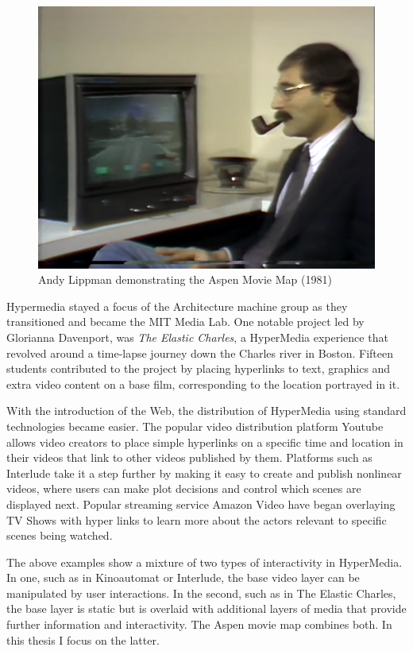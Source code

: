    \begin{figure}[thpb]
      \centering
      \includegraphics[width=\textwidth]{figures/aspenmoviemap.png}
      \caption{Andy Lippman demonstrating the Aspen Movie Map (1981)\cite{lippman1978aspen}}
      \label{fig_pier9}
   \end{figure}

Hypermedia stayed a focus of the Architecture machine group as they transitioned and became the MIT Media Lab. One notable project led by Glorianna Davenport, was \textit{The Elastic Charles}\cite{brondmo1990creating}, a HyperMedia experience that revolved around a time-lapse journey down the Charles river in Boston. Fifteen students contributed to the project by placing hyperlinks to text, graphics and extra video content on a base film, corresponding to the location portrayed in it. 

With the introduction of the Web, the distribution of HyperMedia using standard technologies became easier. The popular video distribution platform Youtube\cite{youtube} allows video creators to place simple hyperlinks on a specific time and location in their videos that link to other videos published by them. Platforms such as Interlude\cite{interlude} take it a step further by making it easy to create and publish nonlinear videos, where users can make plot decisions and control which scenes are displayed next. Popular streaming service Amazon Video \cite{amazonvideo} have began overlaying TV Shows with hyper links to learn more about the actors relevant to specific scenes being watched.

The above examples show a mixture of two types of interactivity in HyperMedia. In one, such as in Kinoautomat or Interlude, the base video layer can be manipulated by user interactions. In the second, such as in The Elastic Charles, the base layer is static but is overlaid with additional layers of media that provide further information and interactivity. The Aspen movie map combines both. In this thesis I focus on the latter.  



